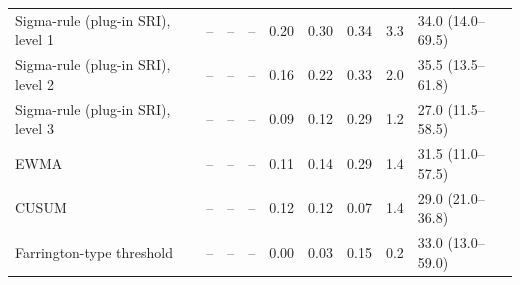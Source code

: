 \documentclass[10pt,a4paper]{article}
\begin{document}
\begin{minipage}{\linewidth}
\begin{tabular}{lrrrrrrrl}
Sigma-rule (plug-in SRI), level 1 & -- & -- & -- & 0.20 & 0.30 & 0.34 & 3.3 & 34.0 (14.0--69.5) \\
Sigma-rule (plug-in SRI), level 2 & -- & -- & -- & 0.16 & 0.22 & 0.33 & 2.0 & 35.5 (13.5--61.8) \\
Sigma-rule (plug-in SRI), level 3 & -- & -- & -- & 0.09 & 0.12 & 0.29 & 1.2 & 27.0 (11.5--58.5) \\
EWMA & -- & -- & -- & 0.11 & 0.14 & 0.29 & 1.4 & 31.5 (11.0--57.5) \\
CUSUM & -- & -- & -- & 0.12 & 0.12 & 0.07 & 1.4 & 29.0 (21.0--36.8) \\
Farrington-type threshold & -- & -- & -- & 0.00 & 0.03 & 0.15 & 0.2 & 33.0 (13.0--59.0) \\
\bottomrule
\end{tabular}
\end{minipage}
\vspace{8pt}
\end{document}
